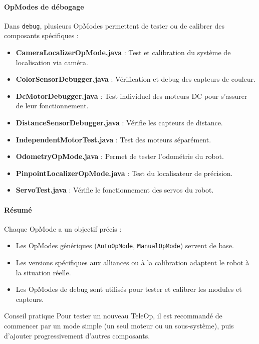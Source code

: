 \documentclass[12pt, a4paper]{report}
\begin{document}
    \paragraph{OpModes de débogage}

    Dans \texttt{debug}, plusieurs OpModes permettent de tester ou de calibrer des composants spécifiques :

    \begin{itemize}
        \item \textbf{CameraLocalizerOpMode.java} : Test et calibration du système de localisation via caméra.
        \item \textbf{ColorSensorDebugger.java} : Vérification et debug des capteurs de couleur.
        \item \textbf{DcMotorDebugger.java} : Test individuel des moteurs DC pour s'assurer de leur fonctionnement.
        \item \textbf{DistanceSensorDebugger.java} : Vérifie les capteurs de distance.
        \item \textbf{IndependentMotorTest.java} : Test des moteurs séparément.
        \item \textbf{OdometryOpMode.java} : Permet de tester l’odométrie du robot.
        \item \textbf{PinpointLocalizerOpMode.java} : Test du localisateur de précision.
        \item \textbf{ServoTest.java} : Vérifie le fonctionnement des servos du robot.
    \end{itemize}

    \paragraph{Résumé}

    Chaque OpMode a un objectif précis :
    \begin{itemize}
        \item Les OpModes génériques (\texttt{AutoOpMode}, \texttt{ManualOpMode}) servent de base.
        \item Les versions spécifiques aux alliances ou à la calibration adaptent le robot à la situation réelle.
        \item Les OpModes de debug sont utilisés pour tester et calibrer les modules et capteurs.
    \end{itemize}

    \begin{myinfo}{Conseil pratique}
        Pour tester un nouveau TeleOp, il est recommandé de commencer par un mode simple (un seul moteur ou un sous-système), puis d’ajouter progressivement d’autres composants.
    \end{myinfo}
\end{document}
